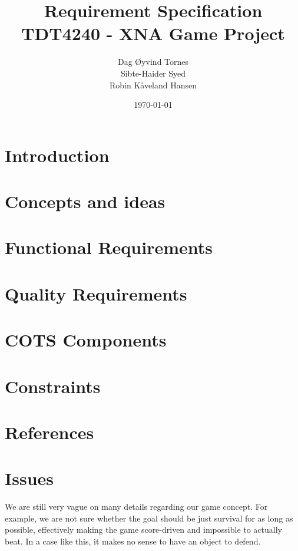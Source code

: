 \documentclass[titlepage,a4paper,11pt]{article}
\date{\today}
\begin{document}
\title{Requirement Specification\\
 		TDT4240 - XNA Game Project}

\author{Dag Øyvind Tornes\\
 		Sibte-Haider Syed\\ 
		Robin Kåveland Hansen\\}
\maketitle

\pagestyle{empty}
\tableofcontents
\clearpage
\pagestyle{plain}

\section{Introduction}


\section{Concepts and ideas}
\label{concepts}


\section{Functional Requirements}
\label{funcreq}



\section{Quality Requirements}
\label{qualreq}


\section{COTS Components}
\label{components}


\section{Constraints}
\label{constraints}


\section{References}

\section{Issues}
We are still very vague on many details regarding our game concept. For example,
we are not sure whether the goal should be just survival for as long as possible,
effectively making the game score-driven and impossible to actually beat. In a
case like this, it makes no sense to have an object to defend.
\end{document}
